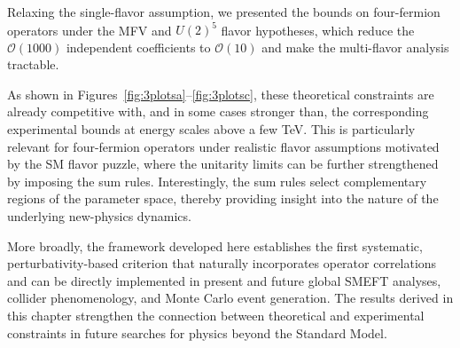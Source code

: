 Relaxing the single-flavor assumption, we presented the bounds on four-fermion operators under the
MFV and $U(2)^5$ flavor hypotheses, which reduce the $\mathcal O(1000)$ independent coefficients to
$\mathcal O(10)$ and make the multi-flavor analysis tractable.

As shown in Figures~\ref{fig:3plotsa}--\ref{fig:3plotsc}, these theoretical constraints are already
competitive with, and in some cases stronger than, the corresponding experimental bounds at energy
scales above a few TeV. This is particularly relevant for four-fermion operators under realistic
flavor assumptions motivated by the SM flavor puzzle, where the unitarity limits can be further
strengthened by imposing the sum rules. Interestingly, the sum rules select complementary regions of
the parameter space, thereby providing insight into the nature of the underlying new-physics
dynamics.

More broadly, the framework developed here establishes the first systematic, per\-tur\-ba\-ti\-vi\-ty-based
criterion that naturally incorporates operator correlations and can be directly implemented in
present and future global SMEFT analyses, collider phenomenology, and Monte Carlo event generation.
The results derived in this chapter strengthen the connection between theoretical and experimental
constraints in future searches for physics beyond the Standard Model.


